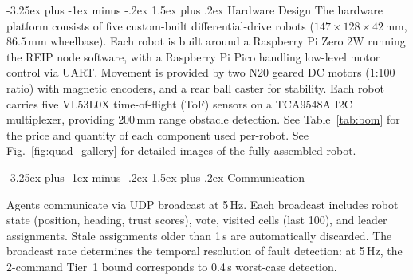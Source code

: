 \documentclass[conference]{IEEEtran}
\makeatletter
\renewcommand{\subsection}{\@startsection{subsection}{2}{\z@}%
  {-3.25ex plus -1ex minus -.2ex}%
  {1.5ex plus .2ex}%
  {\normalfont\normalsize\itshape\centering}}
\makeatother
\begin{document}
\subsection{Hardware Design}
\label{sec:hw_arch}
The hardware platform consists of five custom-built differential-drive robots ($147 \times 128 \times 42\,$mm, $86.5\,$mm wheelbase). Each robot is built around a Raspberry Pi Zero 2W running the REIP node software, with a Raspberry Pi Pico handling low-level motor control via UART. Movement is provided by two N20 geared DC motors (1:100 ratio) with magnetic encoders, and a rear ball caster for stability.  Each robot carries five VL53L0X time-of-flight (ToF) sensors on a TCA9548A I2C multiplexer, providing $200\,$mm range obstacle detection. See Table~\ref{tab:bom} for the price and quantity of each component used per-robot. See Fig.~\ref{fig:quad_gallery} for detailed images of the fully assembled robot.

\subsection{Communication}
\label{sec:communication}

Agents communicate via UDP broadcast at 5\,Hz. Each broadcast includes robot state (position, heading, trust scores), vote, visited cells (last 100), and leader assignments. Stale assignments older than 1\,s are automatically discarded. The broadcast rate determines the temporal resolution of fault detection: at 5\,Hz, the 2-command Tier~1 bound corresponds to 0.4\,s worst-case detection.
\end{document}
